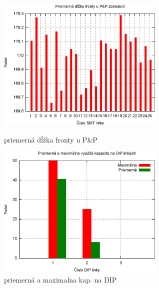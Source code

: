 \documentclass[12pt,a4paper,titlepage,final]{article}
\begin{document}
\begin{figure}[!h]
  \centering
  \begin{minipage}{0.45\linewidth}
  \centering
  \includegraphics[width=8cm]{doc/3_hist3.eps}
  \caption{priemerná dĺžka fronty u P\&P}
  \end{minipage}
  \quad
  \begin{minipage}{0.45\linewidth}
    \centering
    \includegraphics[width=8cm]{doc/3_hist4.eps}
    \caption{priemerná a maximalna kap. na DIP}
  \end{minipage}
\end{figure}
\end{document}
